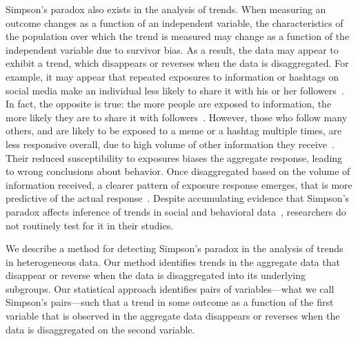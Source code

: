 Simpson's paradox also exists in the analysis of trends. When measuring an outcome changes as a function of an independent variable, the characteristics of the population over which the trend is measured may change as a function of the independent variable due to survivor bias. As a result, the data may appear to exhibit a trend, which disappears or reverses when the data is disaggregated. %
For example, it may appear that repeated exposures to information or hashtags on social media make an individual less likely to share it with his or her followers~\cite{Romero11www}. In fact, the opposite is true: the more people are exposed to information, the more likely they are to share it with followers~\cite{Lerman2016futureinternet}. However, those who follow many others, and are likely to be exposed to a meme or a hashtag multiple times, are less responsive overall, due to high volume of other information they receive~\cite{Hodas12socialcom}. Their reduced susceptibility to exposures biases the aggregate response, leading to wrong conclusions about behavior. Once disaggregated based on the volume of information received, a clearer pattern of exposure response emerges, that is more predictive of the actual response~\cite{Hodas14srep}.
Despite accumulating evidence that Simpson's paradox %
affects inference of trends in social and behavioral data~\cite{Singer2016plosone,Barbosa2016,KootiA2017www,Agarwal2017quitting}, researchers do not routinely test for it in their studies.

We describe a method for detecting Simpson's paradox in the analysis of trends in heterogeneous data. Our method identifies trends in the aggregate data that disappear or reverse when the data is disaggregated into its underlying subgroups.
Our statistical approach identifies pairs of variables---what we call Simpson's pairs---such that a trend in some outcome as a function of the first variable that is observed in the aggregate data  disappears or reverses when the data is disaggregated on the second variable.

